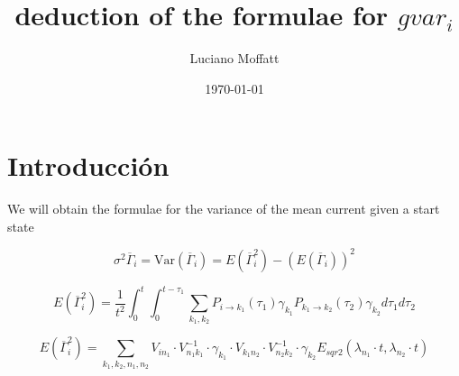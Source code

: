 \documentclass{article} %
\begin{document}
	
	\title{deduction of the formulae for $gvar_i$}
	\author{Luciano Moffatt}
	\date{\today}
	\maketitle
	\section{Introducción}
	
   We will obtain the formulae for the variance of the mean current given a start state
   
   
 \begin{equation}
 	\sigma^2 \overline{\Gamma}_{i}=\text{Var}(\overline{\Gamma}_{i}) = E(\overline{\Gamma}_{i}^2) - \left( E(\overline{\Gamma}_{i}) \right)^2
 	\label{eq:sigma_gamma_expression}
 \end{equation} 
	
\begin{equation}
	E(\overline{\Gamma}_{i}^2) = \frac{1}{t^2} \int_0^t \int_0^{t-\tau_1} \sum_{k_1, k_2} P_{i \rightarrow k_1}(\tau_1) \gamma_{k_1} P_{k_1 \rightarrow k_2}(\tau_2) \gamma_{k_2}  d\tau_1 d\tau_2
	\label{eq:sqr_gamma_integral}
\end{equation}
	
\begin{equation}
	E(\overline{\Gamma}_{i }^2) =  \sum_{k_1, k_2, n_1, n_2} V_{i n_1} \cdot V^{-1}_{n_1 k_1} \cdot \gamma_{k_1} \cdot V_{k_1 n_2} \cdot V^{-1}_{n_2 k_2} \cdot \gamma_{k_2}  E_{sqr2}(\lambda_{n_1} \cdot t, \lambda_{n_2} \cdot t)
	\label{eq:sqr_gamma_formula}
\end{equation}
	
	
\end{document}

